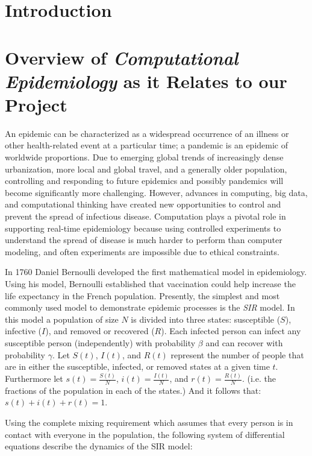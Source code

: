 \documentclass[12pt, oneside, openany]{article} %
\begin{document}

\tableofcontents
\newpage

\section{Introduction}

\section{Overview of \textit{Computational Epidemiology} as it Relates to our Project}
An epidemic can be characterized as a widespread occurrence of an illness or other health-related event at a particular time; a pandemic is an epidemic of worldwide proportions. Due to emerging global trends of increasingly dense urbanization, more local and global travel, and a generally older population, controlling and responding to future epidemics and possibly pandemics will become significantly more challenging. However, advances in computing, big data, and computational thinking have created new opportunities to control and prevent the spread of infectious disease. Computation plays a pivotal role in supporting real-time epidemiology because using controlled experiments to understand the spread of disease is much harder to perform than computer modeling, and often experiments are impossible due to ethical constraints. 

In 1760 Daniel Bernoulli developed the first mathematical model in epidemiology. Using his model, Bernoulli established that vaccination could help increase the life expectancy in the French population. Presently, the simplest and most commonly used model to demonstrate epidemic processes is the \emph{SIR} model. In this model a population of size $N$ is divided into three states: susceptible ($S$), infective ($I$), and removed or recovered ($R$). Each infected person can infect any susceptible person (independently) with probability $\beta$ and can recover with probability $\gamma$. Let $S(t)$, $I(t)$, and $R(t)$ represent the number of people that are in either the susceptible, infected, or removed states at a given time $t$. Furthermore let $s(t) = \frac{S(t)}{N}$, $i(t) = \frac{I(t)}{N}$, and $r(t) = \frac{R(t)}{N}$. (i.e. the fractions of the population in each of the states.) And it follows that: $s(t) + i(t) + r(t) = 1$. 

Using the complete mixing requirement which assumes that every person is in contact with everyone in the population, the following system of differential equations describe the dynamics of the SIR model:
\end{document}
